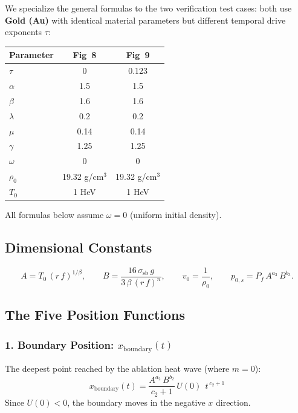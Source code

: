 \documentclass[11pt]{article}
\begin{document}
We specialize the general formulas to the two verification test cases: both use \textbf{Gold (Au)} with identical material parameters but different temporal drive exponents $\tau$:
\begin{center}
\begin{tabular}{lcc}
\hline
Parameter & Fig~8 & Fig~9 \\
\hline
$\tau$ & 0 & 0.123 \\
$\alpha$ & 1.5 & 1.5 \\
$\beta$ & 1.6 & 1.6 \\
$\lambda$ & 0.2 & 0.2 \\
$\mu$ & 0.14 & 0.14 \\
$\gamma$ & 1.25 & 1.25 \\
$\omega$ & 0 & 0 \\
$\rho_0$ & 19.32 g/cm$^3$ & 19.32 g/cm$^3$ \\
$T_0$ & 1 HeV & 1 HeV \\
\hline
\end{tabular}
\end{center}

All formulas below assume $\omega = 0$ (uniform initial density).

\subsection{Dimensional Constants}

\begin{equation}
  A = T_0\,(r\,f)^{1/\beta}, \qquad
  B = \frac{16\,\sigma_{\mathrm{sb}}\,g}{3\,\beta\,(r\,f)^{n}}, \qquad
  v_0 = \frac{1}{\rho_0}, \qquad
  p_{0,s} = P_f\,A^{a_3}\,B^{b_3}.
\end{equation}

\subsection{The Five Position Functions}

\subsubsection{1. Boundary Position: $x_{\mathrm{boundary}}(t)$}

The deepest point reached by the ablation heat wave (where $m=0$):
\begin{equation}
  \boxed{
  x_{\mathrm{boundary}}(t) = \frac{A^{a_2}\,B^{b_2}}{c_2+1}\,U(0)\;\,t^{\,c_2+1}}
  \label{eq:x_bnd}
\end{equation}
Since $U(0) < 0$, the boundary moves in the negative $x$ direction.
\end{document}
